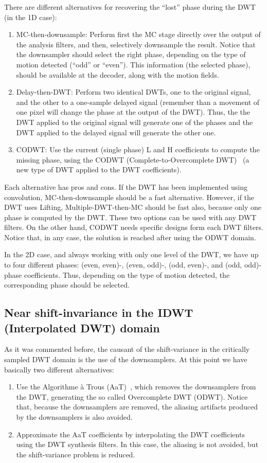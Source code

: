 There are different alternatives for recovering the ``lost'' phase
during the DWT (in the 1D case):
\begin{enumerate}
\item MC-then-downsample: Perform first the MC stage directly over the
  output of the analysis filters, and then, selectively downsample the
  result. Notice that the downsampler should select the right phase,
  depending on the type of motion detected (``odd'' or ``even''). This
  information (the selected phase), should be available at the
  decoder, along with the motion fields.
\item Delay-then-DWT: Perform two identical DWTs, one to the original
  signal, and the other to a one-sample delayed signal (remember than
  a movement of one pixel will change the phase at the output of the
  DWT). Thus, the the DWT applied to the original signal will generate
  one of the phases and the DWT applied to the delayed signal will
  generate the other one.
\item CODWT: Use the current (single phase) L and H coefficients to
  compute the missing phase, using the CODWT (Complete-to-Overcomplete
  DWT)~\cite{andreopoulos2005complete} (a new type of DWT applied to
  the DWT coefficients).
\end{enumerate}
Each alternative has pros and cons. If the DWT has been implemented
using convolution, MC-then-downsample should be a fast
alternative. However, if the DWT uses Lifting, Multiple-DWT-then-MC
should be fast also, because only one phase is computed by the
DWT. These two options can be used with any DWT filters. On the other
hand, CODWT needs specific designs form each DWT filters. Notice that, in any case, the solution is reached after using the ODWT domain.

In the 2D case, and always working with only one level of the DWT, we
have up to four different phases: (even, even)-, (even, odd)-, (odd,
even)-, and (odd, odd)-phase coefficients. Thus, depending on the type
of motion detected, the corresponding phase should be selected.

\subsection{Near shift-invariance in the IDWT (Interpolated DWT) domain}
As it was commented before, the causant of the shift-variance in the
critically sampled DWT domain is the use of the downsamplers. At this
point we have basically two different alternatives:
\begin{enumerate}
\item Use the Algorithme \`a Trous (AaT)~\cite{mallat1999wavelet},
  which removes the downsamplers from the DWT, generating the so
  called Overcomplete DWT (ODWT). Notice that, because the
  downsamplers are removed, the aliasing artifacts produced by the
  downsamplers is also avoided.
\item Approximate the AaT coefficients by interpolating the DWT
  coefficients using the DWT synthesis filters. In this case, the
  aliasing is not avoided, but the shift-variance problem is
  reduced.
\end{enumerate}

